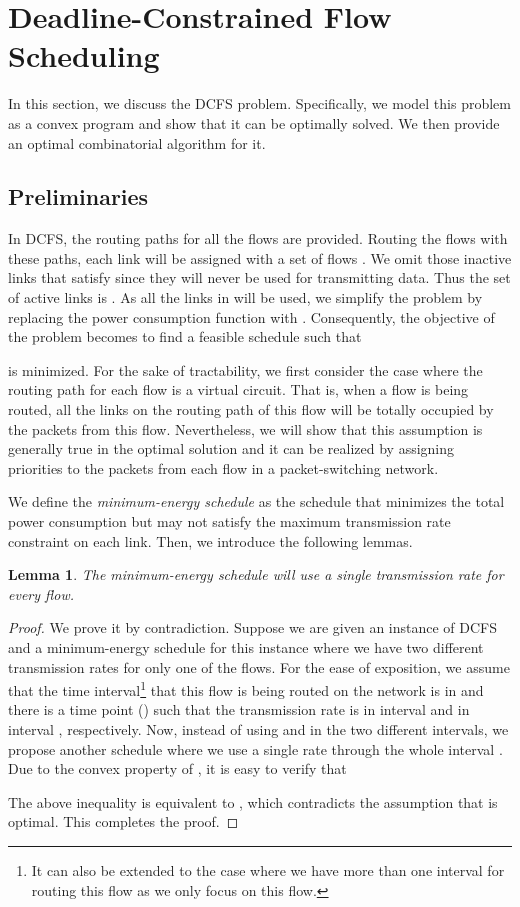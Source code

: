 \documentclass[10pt, conference, compsocconf]{IEEEtran}
\newtheorem{lemma}{Lemma}
\begin{document}
\section{Deadline-Constrained Flow Scheduling}
\label{sec:dts}

In this section, we discuss the DCFS problem. Specifically, we model this problem as a convex program and show that it can be optimally solved. We then provide an optimal combinatorial algorithm for it.

\subsection{Preliminaries}

In DCFS, the routing paths for all the flows are provided. Routing the flows with these paths, each link will be assigned with a set of flows .
We omit those inactive links that satisfy  since they will never be used for transmitting data. Thus the set of active links is . As all the links in  will be used, we simplify the problem by replacing the power consumption function with . Consequently, the objective of the problem becomes to find a feasible schedule  such that

is minimized. For the sake of tractability, we first consider the case where the routing path for each flow is a virtual circuit. That is, when a flow is being routed, all the links on the routing path of this flow will be totally occupied by the packets from this flow. Nevertheless, we will show that this assumption is generally true in the optimal solution and it can be realized by assigning priorities to the packets from each flow in a packet-switching network. 

We define the \emph{minimum-energy schedule} as the schedule that minimizes the total power consumption but may not satisfy the maximum transmission rate constraint on each link. Then, we introduce the following lemmas.
\begin{lemma}
\label{lm:unique}
The minimum-energy schedule will use a single transmission rate for every flow.
\end{lemma}

\begin{proof}
We prove it by contradiction. Suppose we are given an instance of DCFS and a minimum-energy schedule  for this instance where we have two different transmission rates for only one of the flows. For the ease of exposition, we assume that the time interval\footnote{It can also be extended to the case where we have more than one interval for routing this flow as we only focus on this flow.} that this flow is being routed on the network is  in  and there is a time point  () such that the transmission rate is  in interval  and  in interval , respectively. Now, instead of using  and  in the two different intervals, we propose another schedule  where we use a single rate  through the whole interval . Due to the convex property of , it is easy to verify that

The above inequality is equivalent to , which contradicts the assumption that  is optimal. This completes the proof.
\end{proof}
\end{document}
